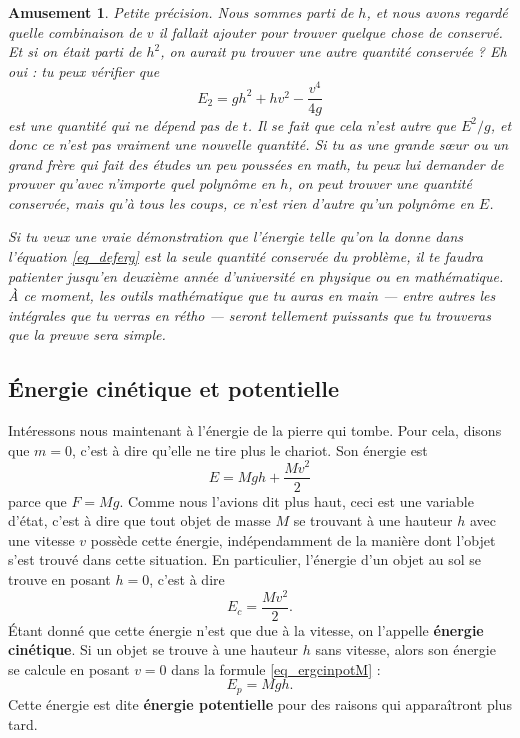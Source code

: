 \documentclass[a4paper,12pt]{book}
\newcounter{numtho}
\theoremstyle{mes_exemples}	\newtheorem{exemple}[numtho]{Exemple}
\newtheorem{amusement}[numtho]{Amusement}
\theoremstyle{mes_tho}
\newenvironment{enplus}{\bgroup\footnotesize\begin{amusement}}{\end{amusement}\egroup}
\newcommand{\defe}[2]{\textbf{#1}\index{#2}}
\begin{document}
\begin{enplus}
Petite précision. Nous sommes parti de $h$, et nous avons regardé quelle combinaison de $v$ il fallait ajouter pour trouver quelque chose de conservé. Et si on était parti de $h^2$, on aurait pu trouver une autre quantité conservée ? Eh oui : tu peux vérifier que
\[ 
  E_2=gh^2+hv^2-\frac{ v^4 }{ 4g }
\]
est une quantité qui ne dépend pas de $t$. Il se fait que cela n'est autre que $E^2/g$, et donc ce n'est pas vraiment une nouvelle quantité. Si tu as une grande s\oe ur ou un grand frère qui fait des études un peu poussées en math, tu peux lui demander de prouver qu'avec n'importe quel polynôme en $h$, on peut trouver une quantité conservée, mais qu'à tous les coups, ce n'est rien d'autre qu'un polynôme en $E$.

Si tu veux une \emph{vraie} démonstration que l'énergie telle qu'on la donne dans l'équation \eqref{eq_deferg}  est la seule quantité conservée du problème, il te faudra patienter jusqu'en deuxième année d'université en physique ou en mathématique. À ce moment, les outils mathématique que tu auras en main --- entre autres les intégrales que tu verras en rétho --- seront tellement puissants que tu trouveras que la preuve sera simple.

\end{enplus}
 
\subsection{Énergie cinétique et potentielle}

Intéressons nous maintenant à l'énergie de la pierre qui tombe. Pour cela, disons que $m=0$, c'est à dire qu'elle ne tire plus le chariot. Son énergie est
\begin{equation}  \label{eq_ergcinpotM}
  E=Mgh+\frac{ Mv^2 }{ 2 }
\end{equation}
parce que $F=Mg$. Comme nous l'avions dit plus haut, ceci est une variable d'état, c'est à dire que tout objet de masse $M$ se trouvant à une hauteur $h$ avec une vitesse $v$ possède cette énergie, indépendamment de la manière dont l'objet s'est trouvé dans cette situation. En particulier, l'énergie d'un objet au sol se trouve en posant $h=0$, c'est à dire
\begin{equation}
  E_c=\frac{ Mv^2 }{ 2 }.
\end{equation}
Étant donné que cette énergie n'est que due à la vitesse, on l'appelle \defe{énergie cinétique}{}. Si un objet se trouve à une hauteur $h$ sans vitesse, alors son énergie se calcule en posant $v=0$ dans la formule \eqref{eq_ergcinpotM} :
\begin{equation}
  E_p=Mgh.
\end{equation}
Cette énergie est dite \defe{énergie potentielle}{} pour des raisons qui apparaîtront plus tard. 
\end{document}
